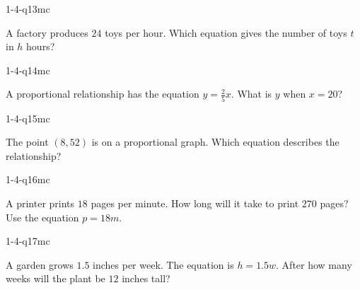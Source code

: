 \begin{practiceQuestion}{1-4-q13}{mc}
\begin{questionText}
A factory produces $24$ toys per hour. Which equation gives the number of toys $t$ in $h$ hours?
\end{questionText}
\end{practiceQuestion}

\begin{practiceQuestion}{1-4-q14}{mc}
\begin{questionText}
A proportional relationship has the equation $y = \frac{2}{5}x$. What is $y$ when $x = 20$?
\end{questionText}
\end{practiceQuestion}

\begin{practiceQuestion}{1-4-q15}{mc}
\begin{questionText}
The point $(8, 52)$ is on a proportional graph. Which equation describes the relationship?
\end{questionText}
\end{practiceQuestion}

\begin{practiceQuestion}{1-4-q16}{mc}
\begin{questionText}
A printer prints $18$ pages per minute. How long will it take to print $270$ pages? Use the equation $p = 18m$.
\end{questionText}
\end{practiceQuestion}

\begin{practiceQuestion}{1-4-q17}{mc}
\begin{questionText}
A garden grows $1.5$ inches per week. The equation is $h = 1.5w$. After how many weeks will the plant be $12$ inches tall?
\end{questionText}
\end{practiceQuestion}

